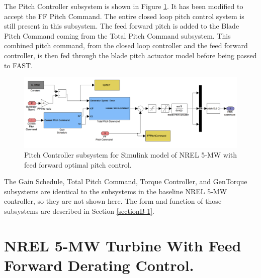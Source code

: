 The Pitch Controller subsystem is shown in Figure \ref{figB-9}. It has been modified to accept the FF Pitch Command. The entire closed loop pitch control system is still present in this subsystem. The feed forward pitch is added to the Blade Pitch Command coming from the Total Pitch Command subsystem. This combined pitch command, from the closed loop controller and the feed forward controller, is then fed through the blade pitch actuator model before being passed to FAST.

\begin{figure}[ht]
	\centering
		\includegraphics[width=\linewidth]{Figures/AppendixBFigures/FF_Pitch3.png}
	\caption{Pitch Controller subsystem for Simulink model of NREL 5-MW with feed forward optimal pitch control.}
	\label{figB-9}
\end{figure}

The Gain Schedule, Total Pitch Command, Torque Controller, and GenTorque subsystems are identical to the subsystems in the baseline NREL 5-MW controller, so they are not shown here. The form and function of those subsystems are described in Section \ref{sectionB-1}.



\section{NREL 5-MW Turbine With Feed Forward Derating Control.} \label{sectionB-3}

